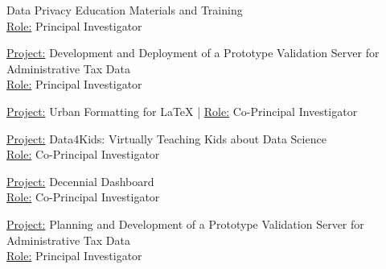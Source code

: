 \grantspace   
    {
        Data Privacy Education Materials and Training \\ 
        \underline{Role:} Principal Investigator
    }


\grantspace    
    { 
        \underline{Project:} Development and Deployment of a Prototype Validation Server for Administrative Tax Data\\
        \underline{Role:} Principal Investigator
    }

\grantspace   
    {
        \underline{Project:} Urban Formatting for LaTeX | 
        \underline{Role:} Co-Principal Investigator
    }

\grantspace  
    {
        \underline{Project:} Data4Kids: Virtually Teaching Kids about Data Science \\ 
        \underline{Role:} Co-Principal Investigator
    }

\grantspace 
    {
        \underline{Project:} Decennial Dashboard  \\ 
        \underline{Role:} Co-Principal Investigator
    }

\grantspace 
    {
        \underline{Project:} Planning and Development of a Prototype Validation Server for Administrative Tax Data\\
        \underline{Role:} Principal Investigator
    }

